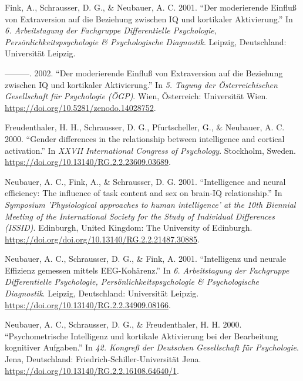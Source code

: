 \documentclass[
]{article}
\author{Dietmar Gerald SCHRAUSSER}
\date{14.04.2026}
\newlength{\cslhangindent}
\newlength{\cslentryspacingunit} %
\newenvironment{CSLReferences}[2] %
 {%
  \setlength{\parindent}{0pt}
  \ifodd #1
  \let\oldpar\par
  \def\par{\hangindent=\cslhangindent\oldpar}
  \fi
  \setlength{\parskip}{#2\cslentryspacingunit}
 }%
 {}
\begin{document}
\hypertarget{refs}{}
\begin{CSLReferences}{1}{0}
\leavevmode{}%
Fink, A., Schrausser, D. G., \& Neubauer, A. C. 2001. {``{Der
moderierende Einfluß von Extraversion auf die Beziehung zwischen IQ und
kortikaler Aktivierung}.''} In \emph{{6. Arbeitstagung der Fachgruppe
Differentielle Psychologie, Persönlichkeitspsychologie \& Psychologische
Diagnostik}}. Leipzig, Deutschland: {Universität Leipzig}.

\leavevmode{}%
---------. 2002. {``{Der moderierende Einfluß von Extraversion auf die
Beziehung zwischen IQ und kortikaler Aktivierung}.''} In \emph{{5.
Tagung der Österreichischen Gesellschaft für Psychologie (ÖGP)}}. Wien,
Österreich: {Universität Wien}.
\url{https://doi.org/10.5281/zenodo.14028752}.

\leavevmode{}%
Freudenthaler, H. H., Schrausser, D. G., Pfurtscheller, G., \& Neubauer,
A. C. 2000. {``{Gender differences in the relationship between
intelligence and cortical activation}.''} In \emph{{XXVII International
Congress of Psychology}}. Stockholm, Sweden.
\url{https://doi.org/10.13140/RG.2.2.23609.03689}.

\leavevmode{}%
Neubauer, A. C., Fink, A., \& Schrausser, D. G. 2001. {``{Intelligence
and neural efficiency: The influence of task content and sex on brain-IQ
relationship}.''} In \emph{{Symposium 'Physiological approaches to human
intelligence' at the 10th Biennial Meeting of the International Society
for the Study of Individual Differences (ISSID)}}. Edinburgh, United
Kingdom: {The University of Edinburgh}.
\url{https://doi.org/doi.org/10.13140/RG.2.2.21487.30885}.

\leavevmode{}%
Neubauer, A. C., Schrausser, D. G., \& Fink, A. 2001. {``{Intelligenz
und neurale Effizienz gemessen mittels EEG-Kohärenz}.''} In \emph{{6.
Arbeitstagung der Fachgruppe Differentielle Psychologie,
Persönlichkeitspsychologie \& Psychologische Diagnostik}}. Leipzig,
Deutschland: {Universität Leipzig}.
\url{https://doi.org/10.13140/RG.2.2.34909.08166}.

\leavevmode{}%
Neubauer, A. C., Schrausser, D. G., \& Freudenthaler, H. H. 2000.
{``{Psychometrische Intelligenz und kortikale Aktivierung bei der
Bearbeitung kognitiver Aufgaben}.''} In \emph{{42. Kongreß der Deutschen
Gesellschaft für Psychologie}}. Jena, Deutschland:
{Friedrich-Schiller-Universität Jena}.
\url{https://doi.org/10.13140/RG.2.2.16108.64640/1}.


\end{CSLReferences}
\end{document}
